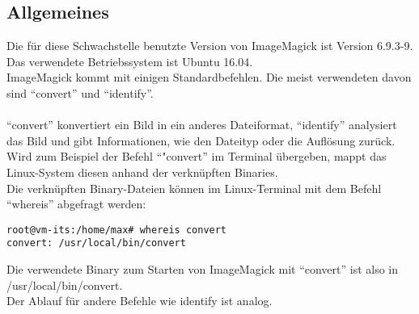 \subsection{Allgemeines}\label{subsec:allgemeines}

Die für diese Schwachstelle benutzte Version von ImageMagick ist Version 6.9.3-9.\\
Das verwendete Betriebssystem ist Ubuntu 16.04.\\

ImageMagick kommt mit einigen Standardbefehlen.
Die meist verwendeten davon sind "`convert"' und "`identify"'.\\\\
"`convert"' konvertiert ein Bild in ein anderes Dateiformat, "`identify"' analysiert das Bild und gibt Informationen, wie den Dateityp oder die Auflösung zurück.\\

Wird zum Beispiel der Befehl "`"convert"' im Terminal übergeben, mappt das Linux-System diesen anhand der verknüpften Binaries.\\

Die verknüpften Binary-Dateien können im Linux-Terminal mit dem Befehl "`whereis"' abgefragt werden:\\

\begin{lstlisting}[language=Text, caption=whereis Binary Abfrage,label={lst:lstlisting}]
root@vm-its:/home/max# whereis convert
convert: /usr/local/bin/convert
\end{lstlisting}
\vspace{5mm}

Die verwendete Binary zum Starten von ImageMagick mit "`convert"' ist also in \\/usr/local/bin/convert.\\
Der Ablauf für andere Befehle wie identify ist analog.\\